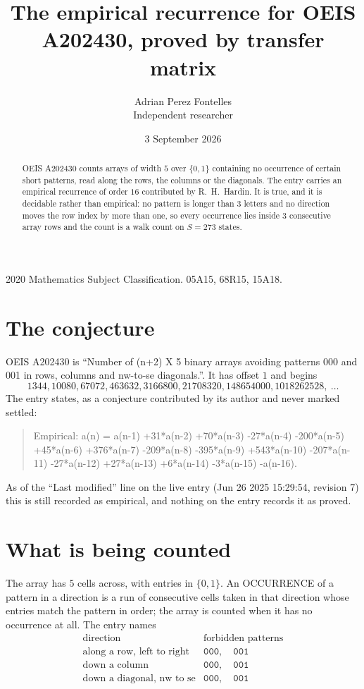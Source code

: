 \documentclass[11pt,a4paper]{article}
\title{The empirical recurrence for OEIS A202430, proved by transfer matrix}
\author{Adrian Perez Fontelles\\ \small Independent researcher}
\date{3 September 2026}
\theoremstyle{plain}
\theoremstyle{definition}
\begin{document}
\maketitle

\begin{abstract}
OEIS A202430 counts arrays of width $5$ over $\{0,1\}$ containing no occurrence of certain short
patterns, read along the rows, the columns or the diagonals. The entry carries an empirical
recurrence of order $16$ contributed by R.~H.~Hardin. It is true, and it is decidable
rather than empirical: no pattern is longer than $3$ letters and no direction moves the row
index by more than one, so every occurrence lies inside $3$ consecutive array rows and the
count is a walk count on $S=273$ states.
\end{abstract}

\noindent\small 2020 Mathematics Subject Classification. 05A15, 68R15, 15A18.\normalsize

\section{The conjecture}

OEIS A202430 is ``Number of (n+2) X 5 binary arrays avoiding patterns 000 and 001 in rows, columns and nw-to-se diagonals.''. It has offset $1$ and begins
\[
1344, 10080, 67072, 463632, 3166800, 21708320, 148654000, 1018262528,\ \dots
\]
The entry states, as a conjecture contributed by its author and never marked settled:
\begin{quote}
Empirical: a(n) = a(n-1) +31*a(n-2) +70*a(n-3) -27*a(n-4) -200*a(n-5) +45*a(n-6) +376*a(n-7) -209*a(n-8) -395*a(n-9) +543*a(n-10) -207*a(n-11) -27*a(n-12) +27*a(n-13) +6*a(n-14) -3*a(n-15) -a(n-16).
\end{quote}
As of the ``Last modified'' line on the live entry (Jun 26 2025 15:29:54, revision 7) this is still
recorded as empirical, and nothing on the entry records it as proved.

\section{What is being counted}

The array has $5$ cells across, with entries in $\{0,1\}$. An OCCURRENCE of a pattern in a
direction is a run of consecutive cells taken in that direction whose entries match the pattern
in order; the array is counted when it has no occurrence at all. The entry names
\[
\begin{array}{ll}
\text{direction} & \text{forbidden patterns} \\[2pt]
\text{along a row, left to right} & \mathtt{000},\quad \mathtt{001} \\
\text{down a column} & \mathtt{000},\quad \mathtt{001} \\
\text{down a diagonal, nw to se} & \mathtt{000},\quad \mathtt{001} \\
\end{array}
\]
\end{document}
